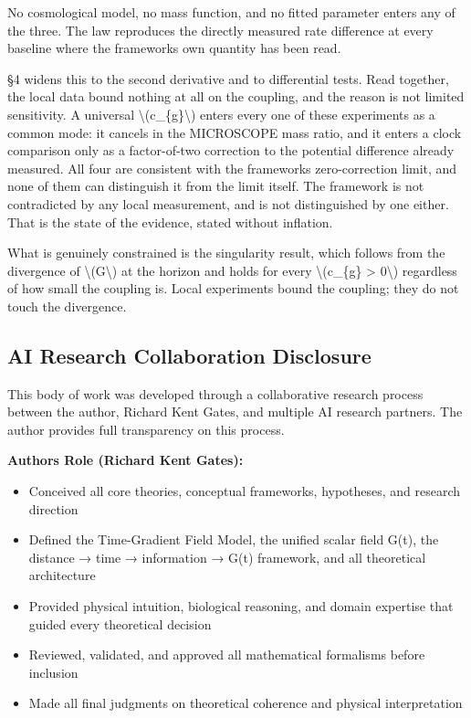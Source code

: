 \documentclass[
  10pt,
]{article}
\providecommand{\tightlist}{%
  \setlength{\itemsep}{0pt}\setlength{\parskip}{0pt}}
\begin{document}
No cosmological model, no mass function, and no fitted parameter enters
any of the three. The law reproduces the directly measured rate
difference at every baseline where the framework\textquotesingle s own
quantity has been read.

§4 widens this to the second derivative and to differential tests. Read
together, the local data bound nothing at all on the coupling, and the
reason is not limited sensitivity. A universal
\textbackslash(c\_\{g\}\textbackslash) enters every one of these
experiments as a common mode: it cancels in the MICROSCOPE mass ratio,
and it enters a clock comparison only as a factor-of-two correction to
the potential difference already measured. All four are consistent with
the framework\textquotesingle s zero-correction limit, and none of them
can distinguish it from the limit itself. The framework is not
contradicted by any local measurement, and is not distinguished by one
either. That is the state of the evidence, stated without inflation.

What is genuinely constrained is the singularity result, which follows
from the divergence of \textbackslash(G\textbackslash) at the horizon
and holds for every \textbackslash(c\_\{g\} \textgreater{}
0\textbackslash) regardless of how small the coupling is. Local
experiments bound the coupling; they do not touch the divergence.

\hypertarget{ai-research-collaboration-disclosure}{%
\subsection{AI Research Collaboration
Disclosure}\label{ai-research-collaboration-disclosure}}

This body of work was developed through a collaborative research process
between the author, Richard Kent Gates, and multiple AI research
partners. The author provides full transparency on this process.

\textbf{Author\textquotesingle s Role (Richard Kent Gates):}

\begin{itemize}
\tightlist
\item
  Conceived all core theories, conceptual frameworks, hypotheses, and
  research direction
\item
  Defined the Time-Gradient Field Model, the unified scalar field G(t),
  the distance → time → information → G(t) framework, and all
  theoretical architecture
\item
  Provided physical intuition, biological reasoning, and domain
  expertise that guided every theoretical decision
\item
  Reviewed, validated, and approved all mathematical formalisms before
  inclusion
\item
  Made all final judgments on theoretical coherence and physical
  interpretation
\end{itemize}
\end{document}
